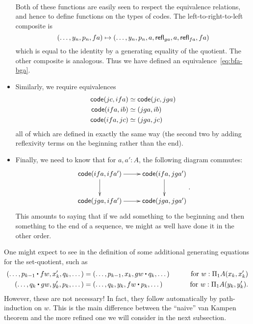 \begin{itemize}
\begin{align*}
  \end{align*}
  Both of these functions are easily seen to respect the equivalence relations, and hence to define functions on the types of codes.
  The left-to-right-to-left composite is
  \[ (\dots, y_n, p_n,fa) \mapsto
  (\dots,y_n,p_n,a,\mathsf{refl}_{ga},a,\mathsf{refl}_{fa},fa)
  \]
  which is equal to the identity by a generating equality of the quotient.
  The other composite is analogous.
  Thus we have defined an equivalence~\eqref{eq:bfa-bga}.
\item Similarly, we require equivalences
  \begin{align*}
    \mathsf{code}(jc,ifa) &\simeq \mathsf{code}(jc,jga)\\
    \mathsf{code}(ifa,ib)&\simeq (jga,ib)\\
    \mathsf{code}(ifa,jc)&\simeq (jga,jc)
  \end{align*}
  all of which are defined in exactly the same way (the second two by adding reflexivity terms on the beginning rather than the end).
\item Finally, we need to know that for $a,a':A$, the following diagram commutes:
  \begin{equation}\label{eq:bfa-bga-comm}
  \vcenter{\xymatrix{
      \code(ifa,ifa') \ar[r]\ar[d] &
      \code(ifa,jga')\ar[d]\\
      \code(jga,ifa')\ar[r] &
      \code(jga,jga')
      }}.
  \end{equation}
  This amounts to saying that if we add something to the beginning and then something to the end of a sequence, we might as well have done it in the other order.
\end{itemize}

\begin{rmk}\label{rmk:naive}
  One might expect to see in the definition of \code some additional generating equations for the set-quotient, such as
  \begin{alignat*}{2}
    (\dots, p_{k-1} \ct fw, x_{k}', q_{k}, \dots) &=
    (\dots, p_{k-1}, x_{k}, gw \ct q_{k}, \dots)
    & \qquad\text{for } w:\Pi_1A(x_{k},x_{k}')\\
    (\dots, q_k \ct gw, y_k', p_k, \dots) &=
    (\dots, q_k, y_k, fw \ct p_k, \dots)
    & \qquad\text{for } w:\Pi_1A(y_k, y_k').
  \end{alignat*}
  However, these are not necessary!
  In fact, they follow automatically by path-induction on $w$.
  This is the main difference between the ``naive'' van Kampen theorem and the more refined one we will consider in the next subsection.
\end{rmk}

